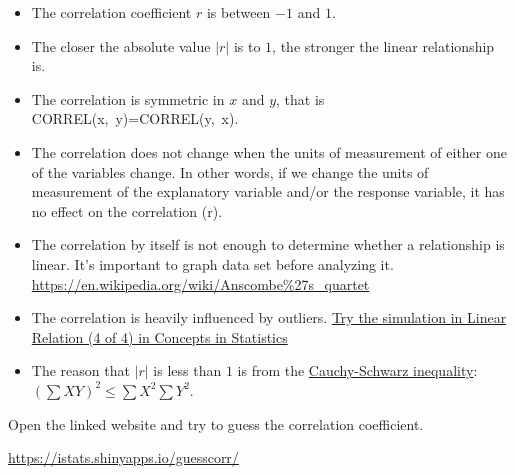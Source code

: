 
\begin{itemize}
\item
  The correlation coefficient \(r\) is between \(-1\) and \(1\).
\item
  The closer the absolute value \(|r|\) is to \(1\), the stronger the
  linear relationship is.
\item
  The correlation is symmetric in \(x\) and \(y\), that is
  \textsf{CORREL(x,\ y)=CORREL(y,\ x)}.
\item
  The correlation does not change when the units of measurement of
  either one of the variables change. In other words, if we change the
  units of measurement of the explanatory variable and/or the response
  variable, it has no effect on the correlation (r).
\item
  The correlation by itself is not enough to determine whether a
  relationship is linear. It's important to graph data set before
  analyzing it.\\
  \href{https://en.wikipedia.org/wiki/Anscombe\%27s_quartet}{https://en.wikipedia.org/wiki/Anscombe\%27s\_quartet}
\item
  The correlation is heavily influenced by outliers.
  \href{https://courses.lumenlearning.com/wmopen-concepts-statistics/chapter/linear-relationships-4-of-4/}{Try
  the simulation in Linear Relation (4 of 4) in Concepts in Statistics}
\item
  The reason that \(|r|\) is less than \(1\) is from the
  \href{https://en.wikipedia.org/wiki/Cauchy\%E2\%80\%93Schwarz_inequality}{Cauchy-Schwarz
  inequality}: \((\sum XY)^2\le \sum X^2\sum Y^2\).
\end{itemize}

\begin{exercise}

  Open the linked website and try  to guess the correlation coefficient.

\href{https://istats.shinyapps.io/guesscorr/}{https://istats.shinyapps.io/guesscorr/}

\end{exercise}

